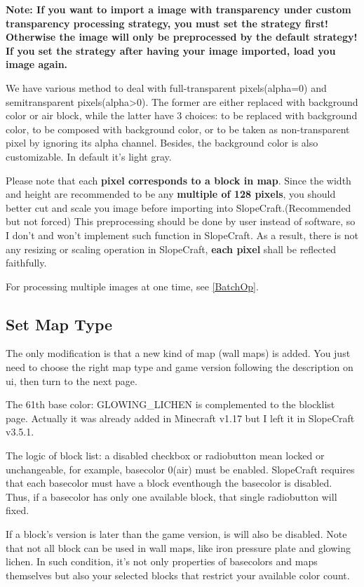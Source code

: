\documentclass{article}
\begin{document}
    \textbf{Note: If you want to import a image with transparency under custom transparency processing strategy, you must set the strategy first! Otherwise the image will only be preprocessed by the default strategy! If you set the strategy after having your image imported, load you image again.}

    We have various method to deal with full-transparent pixels(alpha=0) and semitransparent pixels(alpha>0). The former are either replaced with background color or air block, while the latter have 3 choices: to be replaced with background color, to be composed with background color, or to be taken as non-transparent pixel by ignoring its alpha channel. Besides, the background color is also customizable. In default it's light gray.

    Please note that each \textbf{pixel corresponds to a block in map}. Since the width and height are recommended to be any \textbf{multiple of 128 pixels}, you should better cut and scale you image before importing into SlopeCraft.(Recommended but not forced) This preprocessing should be done by user instead of software, so I don't and won't implement such function in SlopeCraft. As a result, there is not any resizing or scaling operation in SlopeCraft, \textbf{each pixel} shall be reflected faithfully.

    For processing multiple images at one time, see \ref{BatchOp}.

    \subsection{Set Map Type}
    The only modification is that a new kind of map (wall maps) is added. You just need to choose the right map type and game version following the description on ui, then turn to the next page.

    The 61th base color: GLOWING\_LICHEN is complemented to the blocklist page. Actually it was already added in Minecraft v1.17 but I left it in SlopeCraft v3.5.1.

    The logic of block list: a disabled checkbox or radiobutton mean locked or unchangeable, for example, basecolor 0(air) must be enabled. SlopeCraft requires that each basecolor must have a block eventhough the basecolor is disabled. Thus, if a basecolor has only one available block, that single radiobutton will fixed.
    
    If a block's version is later than the game version, is will also be disabled. Note that not all block can be used in wall maps, like iron pressure plate and glowing lichen. In such condition, it's not only properties of basecolors and maps themselves but also your selected blocks that restrict your available color count.
\end{document}
